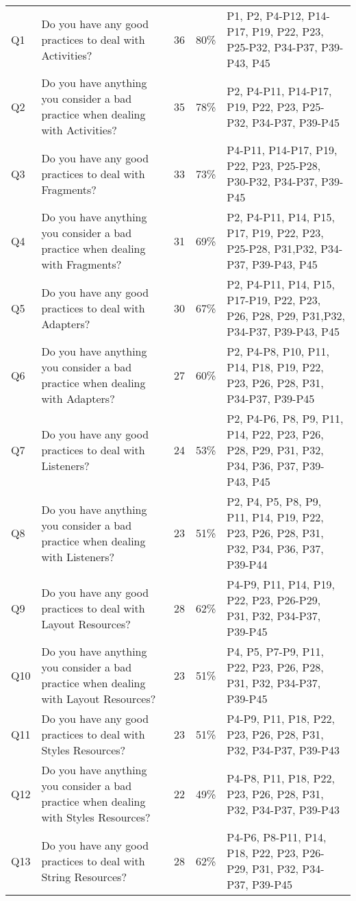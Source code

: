 \begin{table*}[t]
\begin{tabular}{@{}lp{9cm}ccp{5.5cm}@{}}
Q1	& Do you have any good practices to deal with Activities?															&36 &80\%	&P1, P2, P4-P12, P14-P17, P19, P22, P23, P25-P32, P34-P37, P39-P43, P45 \\
Q2	& Do you have anything you consider a bad practice when dealing with Activities?									&35 &78\%	&P2, P4-P11, P14-P17, P19, P22, P23, P25-P32, P34-P37, P39-P45 \\
Q3	& Do you have any good practices to deal with Fragments?															&33	&73\%	&P4-P11, P14-P17, P19, P22, P23, P25-P28, P30-P32, P34-P37, P39-P45 \\
Q4	& Do you have anything you consider a bad practice when dealing with Fragments?										&31	&69\%	&P2, P4-P11, P14, P15, P17, P19, P22, P23, P25-P28, P31,P32, P34-P37, P39-P43, P45 \\
Q5	& Do you have any good practices to deal with Adapters?																&30	&67\%	&P2, P4-P11, P14, P15, P17-P19, P22, P23, P26, P28, P29, P31,P32, P34-P37, P39-P43, P45 \\
Q6	& Do you have anything you consider a bad practice when dealing with Adapters?										&27	&60\%	&P2, P4-P8, P10, P11, P14, P18, P19, P22, P23, P26, P28, P31, P34-P37, P39-P45 \\
Q7	& Do you have any good practices to deal with Listeners?															&24	&53\%	&P2, P4-P6, P8, P9, P11, P14, P22, P23, P26, P28, P29, P31, P32, P34, P36, P37, P39-P43, P45 \\
Q8	& Do you have anything you consider a bad practice when dealing with Listeners?										&23	&51\%	&P2, P4, P5, P8, P9, P11, P14, P19, P22, P23, P26, P28, P31, P32, P34, P36, P37, P39-P44 \\
Q9	& Do you have any good practices to deal with Layout Resources?														&28	&62\%	&P4-P9, P11, P14, P19, P22, P23, P26-P29, P31, P32, P34-P37, P39-P45 \\
Q10	& Do you have anything you consider a bad practice when dealing with Layout Resources?								&23	&51\%	&P4, P5, P7-P9, P11, P22, P23, P26, P28, P31, P32, P34-P37, P39-P45 \\
Q11	& Do you have any good practices to deal with Styles Resources?														&23	&51\%	&P4-P9, P11, P18, P22, P23, P26, P28, P31, P32, P34-P37, P39-P43 \\
Q12	& Do you have anything you consider a bad practice when dealing with Styles Resources?								&22	&49\%	&P4-P8, P11, P18, P22, P23, P26, P28, P31, P32, P34-P37, P39-P43 \\
Q13	& Do you have any good practices to deal with String Resources?														&28	&62\%	&P4-P6, P8-P11, P14, P18, P22, P23, P26-P29, P31, P32, P34-P37, P39-P45 \\

\end{tabular}
\end{table*}
